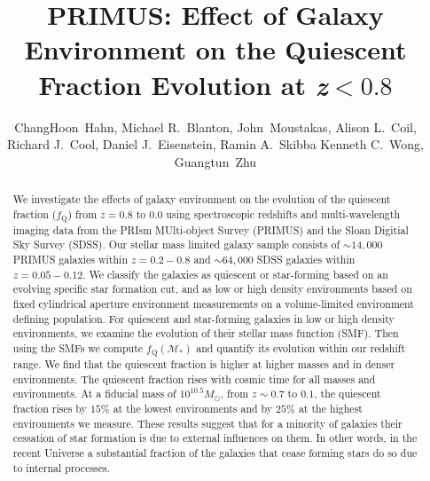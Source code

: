 \documentclass{emulateapj}
\begin{document}
\title{PRIMUS: Effect of Galaxy Environment on the Quiescent Fraction Evolution at \lowercase{\textit{z}}$<0.8$}
\author{
ChangHoon~Hahn, 
Michael R.~Blanton, 
John~Moustakas,
Alison L.~Coil, 
Richard J.~Cool, 
Daniel J.~Eisenstein,
Ramin A.~Skibba
Kenneth C.~Wong, 
Guangtun~Zhu
}
\begin{abstract}
We investigate the effects of galaxy environment on the evolution of
the quiescent fraction ($f_{\mathrm{Q}}$) from $z =0.8 $ to $ 0.0$ using
spectroscopic redshifts and multi-wavelength imaging data from the
PRIsm MUlti-object Survey (PRIMUS) and the Sloan Digitial Sky Survey
(SDSS). Our stellar mass limited galaxy sample consists of $\sim
14,000$ PRIMUS galaxies within $z = 0.2-0.8$ and $\sim 64,000$ SDSS
galaxies within $z = 0.05-0.12$. We classify the galaxies as quiescent
or star-forming based on an evolving specific star formation cut, and
as low or high density environments based on fixed cylindrical
aperture environment measurements on a volume-limited environment
defining population. For quiescent and
star-forming galaxies in low or high density environments, we examine
the evolution of their stellar mass function (SMF). Then using the
SMFs we compute $f_{\mathrm{Q}}(\mathcal{M}_{*})$ and quantify its
evolution within our redshift range. We find that the quiescent
fraction is higher at higher masses and in denser environments. The
quiescent fraction rises with cosmic time for all masses and
environments. At a fiducial mass of $10^{10.5}M_\odot$, from $z\sim
0.7$ to $0.1$, the quiescent fraction rises by $15\%$ at the
lowest environments and by $25\%$ at the highest environments we measure.
These results suggest that for a minority of galaxies their cessation
of star formation is due to external influences on
them. In other words, in the recent Universe a substantial fraction of the
galaxies that cease forming stars do so due to internal processes.
\end{abstract}
\end{document}
